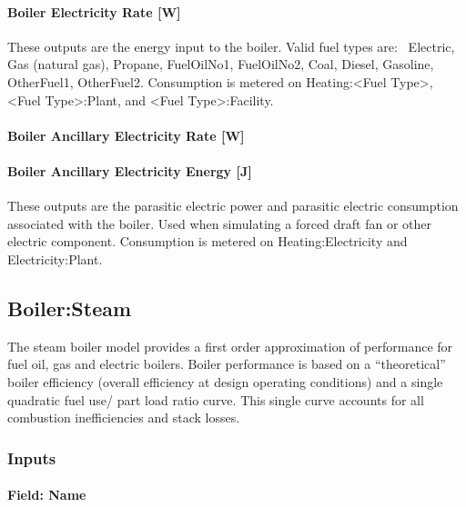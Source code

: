 \paragraph{Boiler Electricity Rate {[}W{]}}\label{boiler-electric-power-w}

These outputs are the energy input to the boiler. Valid fuel types are:~ Electric, Gas (natural gas), Propane, FuelOilNo1, FuelOilNo2, Coal, Diesel, Gasoline, OtherFuel1, OtherFuel2. Consumption is metered on Heating:\textless{}Fuel Type\textgreater{}, \textless{}Fuel Type\textgreater{}:Plant, and \textless{}Fuel Type\textgreater{}:Facility.

\paragraph{Boiler Ancillary Electricity Rate {[}W{]}}\label{boiler-ancillary-electric-power-w}

\paragraph{Boiler Ancillary Electricity Energy {[}J{]}}\label{boiler-ancillary-electric-energy-j}

These outputs are the parasitic electric power and parasitic electric consumption associated with the boiler. Used when simulating a forced draft fan or other electric component. Consumption is metered on Heating:Electricity and Electricity:Plant.

\subsection{Boiler:Steam}\label{boilersteam}

The steam boiler model provides a first order approximation of performance for fuel oil, gas and electric boilers. Boiler performance is based on a ``theoretical'' boiler efficiency (overall efficiency at design operating conditions) and a single quadratic fuel use/ part load ratio curve. This single curve accounts for all combustion inefficiencies and stack losses.

\subsubsection{Inputs}\label{inputs-11-012}

\paragraph{Field: Name}\label{field-name-10-011}

